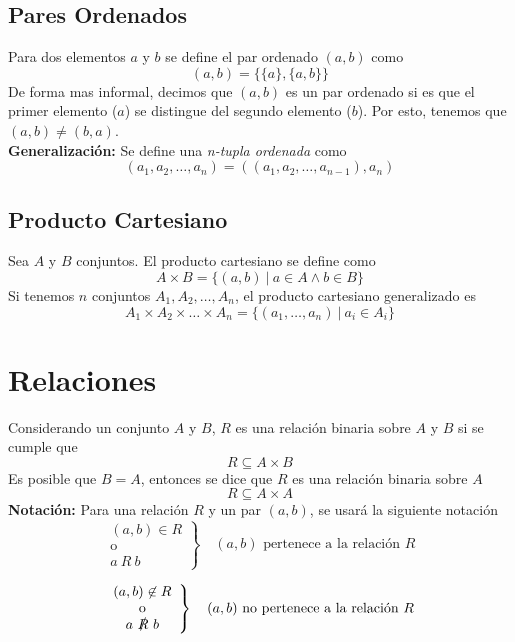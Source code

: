\documentclass[../main.tex]{subfiles}
\begin{document}
\subsection{Pares Ordenados}
Para dos elementos $a$ y $b$ se define el par ordenado $(a,b)$ como
\[ (a,b) = \{ \{ a \}, \{ a,b \} \} \]
De forma mas informal, decimos que $(a,b)$ es un par ordenado si es que el primer elemento ($a$) se distingue del segundo elemento ($b$). Por esto, tenemos que $(a,b) \not= (b,a)$.\\
\textbf{Generalización:} Se define una \textit{n-tupla ordenada} como
\[ (a_1, a_2, \ldots, a_n) = ((a_1, a_2, \ldots, a_{n-1}), a_n) \]

\subsection{Producto Cartesiano}
Sea $A$ y $B$ conjuntos. El producto cartesiano se define como
\[ A \times B = \{ (a,b) \  | \  a \in A \wedge b \in B \} \]
Si tenemos $n$ conjuntos $A_1, A_2, \ldots, A_n$, el producto cartesiano generalizado es
\[ A_1 \times A_2 \times \ldots \times A_n = \{ (a_1, \ldots, a_n) \  | \ a_i \in A_i \} \]

\section{Relaciones}
Considerando un conjunto $A$ y $B$, $R$ es una relación binaria sobre $A$ y $B$ si se cumple que
\[ R \subseteq A \times B \]
Es posible que $B = A$, entonces se dice que $R$ es una relación binaria sobre $A$
\[ R \subseteq A \times A \]
\textbf{Notación:} Para una relación $R$ y un par $(a,b)$, se usará la siguiente notación\\
\[
    \left.
        \begin{array}{c}
            (a,b) \in R \\
            \text{o} \\
            a \ R \ b
        \end{array}
    \right	
        \} \quad (a, b) \text{ pertenece a la relación } R
\]


\[
    \left.
        \begin{array}{c}
            (a,b) \not\in R \\
            \text{o}\\
            a \ \slashed{R} \ b
        \end{array}
    \right
        \} \quad (a,b) \text{ no pertenece a la relación } R
\]
\end{document}
